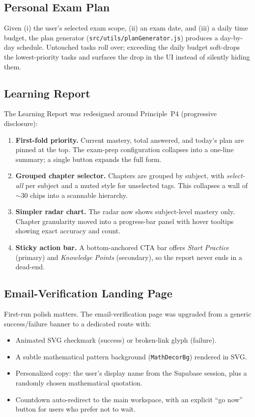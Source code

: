 \documentclass[11pt,a4paper]{article}
\newcommand{\code}[1]{\texttt{\small #1}}
\newcommand{\file}[1]{\textcolor{mcslate}{\texttt{\small #1}}}
\begin{document}
\subsection{Personal Exam Plan}

Given (i) the user's selected exam scope, (ii) an exam date, and (iii) a daily time budget, the plan generator (\file{src/utils/planGenerator.js}) produces a day-by-day schedule. Untouched tasks roll over; exceeding the daily budget soft-drops the lowest-priority tasks and surfaces the drop in the UI instead of silently hiding them.

\subsection{Learning Report}
\label{sec:learning-report}

The Learning Report was redesigned around Principle~P4 (progressive disclosure):

\begin{enumerate}[leftmargin=*]
    \item \textbf{First-fold priority.} Current mastery, total answered, and today's plan are pinned at the top. The exam-prep configuration collapses into a one-line summary; a single button expands the full form.
    \item \textbf{Grouped chapter selector.} Chapters are grouped by subject, with \emph{select-all} per subject and a muted style for unselected tags. This collapses a wall of $\sim\!30$ chips into a scannable hierarchy.
    \item \textbf{Simpler radar chart.} The radar now shows subject-level mastery only. Chapter granularity moved into a progress-bar panel with hover tooltips showing exact accuracy and count.
    \item \textbf{Sticky action bar.} A bottom-anchored CTA bar offers \emph{Start Practice} (primary) and \emph{Knowledge Points} (secondary), so the report never ends in a dead-end.
\end{enumerate}

\subsection{Email-Verification Landing Page}

First-run polish matters. The email-verification page was upgraded from a generic success/failure banner to a dedicated route with:

\begin{itemize}
    \item Animated SVG checkmark (success) or broken-link glyph (failure).
    \item A subtle mathematical pattern background (\code{MathDecorBg}) rendered in SVG.
    \item Personalized copy: the user's display name from the Supabase session, plus a randomly chosen mathematical quotation.
    \item Countdown auto-redirect to the main workspace, with an explicit ``go now'' button for users who prefer not to wait.
\end{itemize}
\end{document}
